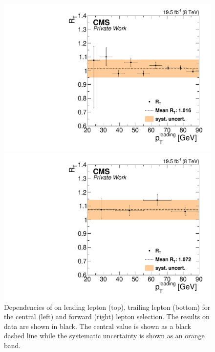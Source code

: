 \begin{figure}[htbp]
\begin{minipage}[t]{0.49\textwidth}
\end{minipage}
\begin{minipage}[t]{0.49\textwidth}
  \includegraphics[width=\textwidth]{plots/BG/trigger/Triggereff_SFvsOF_Syst_AlphaT_HighHTExclusiveCentral_Full2012_LeadingPt_trailingPt20.pdf}
\end{minipage}
\begin{minipage}[t]{0.49\textwidth}
\includegraphics[width=\textwidth]{plots/BG/trigger/Triggereff_SFvsOF_Syst_AlphaT_HighHTExclusiveForward_Full2012_LeadingPt_trailingPt20.pdf}
\end{minipage}

\caption{Dependencies of \RT on leading lepton \pt (top), trailing lepton \pt (bottom) for the central (left) and forward (right) lepton selection. The results on data are shown in black. The central value is shown as a black dashed line while the systematic uncertainty is shown as an orange band.}
\label{fig:RTDependenciesApp1}
\end{figure}  

